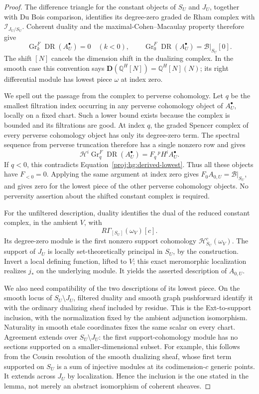\documentclass[11pt,letterpaper]{article}
\theoremstyle{definition}
\theoremstyle{remark}
\begin{document}
\begin{proof}
The difference triangle for the constant objects of \(S_U\) and
\(J_U\), together with Du Bois comparison, identifies its
degree-zero graded de Rham complex with
\(\mathcal I_{J_U/S_U}\).  Coherent duality and the
maximal-Cohen--Macaulay property therefore give
\begin{equation}\label{proj:hg:derived-lowest}
 \operatorname{Gr}^F_k\operatorname{DR}(A^\bullet_U)=0\quad(k<0),
 \qquad
 \operatorname{Gr}^F_0\operatorname{DR}(A^\bullet_U)=\mathcal B|_{S_U}[0].
\end{equation}
The shift \([N]\) cancels the dimension shift in the dualizing
complex.  In the smooth case this convention says
\(\mathbf D(\mathbb{Q}^H[N])=\mathbb{Q}^H[N](N)\); its right differential module
has lowest piece \(\omega\) at index zero.

We spell out the passage from the complex to perverse cohomology.
Let \(q\) be the smallest filtration index occurring in any
perverse cohomology object of \(A^\bullet_U\), locally on a fixed
chart.  Such a lower bound exists because the complex is bounded
and its filtrations are good.  At index \(q\), the graded Spencer
complex of every perverse cohomology object has only its
degree-zero term.  The spectral sequence from perverse truncation
therefore has a single nonzero row and gives
\[
 \mathcal H^i\operatorname{Gr}^F_q\operatorname{DR}(A^\bullet_U)
   =F_q\,{}^p\!H^iA^\bullet_U.
\]
If \(q<0\), this contradicts Equation~\eqref{proj:hg:derived-lowest}.
Thus all these objects have \(F_{<0}=0\).  Applying the same
argument at index zero gives \(F_0A_{0,U}=\mathcal B|_{S_U}\),
and gives zero for the lowest piece of the other perverse
cohomology objects.  No perversity assertion about the shifted
constant complex is required.

For the unfiltered description, duality identifies the dual of the
reduced constant complex, in the ambient \(V\), with
\[
 R\Gamma_{[S_U]}(\omega_V)[c].
\]
Its degree-zero module is the first nonzero support cohomology
\(\mathcal H^c_{S_U}(\omega_V)\).  The support of \(J_U\) is locally
set-theoretically principal in \(S_U\), by the construction.
Invert a local defining function, lifted to \(V\); this exact
meromorphic localization realizes \(j_*\) on the underlying
module.  It yields the asserted description of \(A_{0,U}\).

We also need compatibility of the two descriptions of its lowest
piece.  On the smooth locus of \(S_U\setminus J_U\), filtered
duality and smooth graph pushforward identify it with the ordinary
dualizing sheaf included by residue.  This is the Ext-to-support
inclusion, with the normalization fixed by the ambient adjunction
isomorphism.  Naturality in smooth etale coordinates fixes the
same scalar on every chart.  Agreement extends over
\(S_U\setminus J_U\): the first support-cohomology module has no
sections supported on a smaller-dimensional subset.  For example,
this follows from the Cousin resolution of the smooth dualizing
sheaf, whose first term supported on \(S_U\) is a sum of injective
modules at its codimension-\(c\) generic points.  It extends across
\(J_U\) by localization.  Hence the inclusion is the one stated
in the lemma, not merely an abstract isomorphism of coherent
sheaves.


\end{proof}
\end{document}
